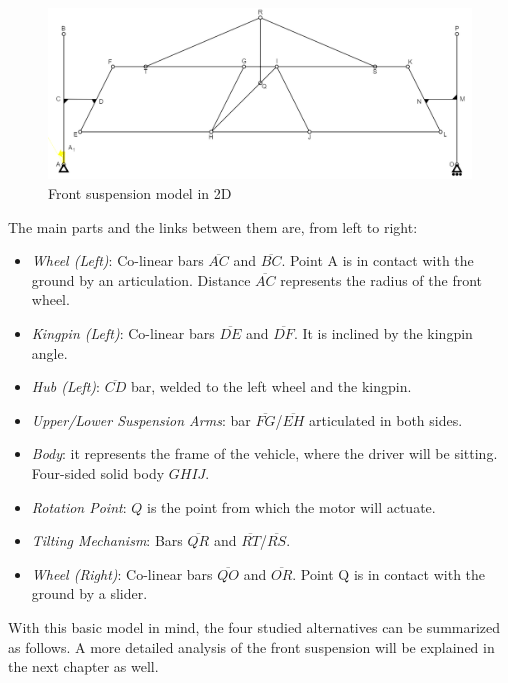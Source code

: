\begin{figure}[h!]
	\includegraphics[width=1.0\linewidth]{figs/04/b}
	\caption{Front suspension model in 2D}
\end{figure}

\newpage
The main parts and the links between them are, from left to right:

\begin{itemize}
\begin{itemize}\itemsep -10pt
	\item \textit{Wheel (Left)}: Co-linear bars $\overline{AC}$ and $\overline{BC}$. Point A is in contact with the ground by an articulation. Distance $\overline{AC}$ represents the radius of the front wheel.
	\item \textit{Kingpin (Left)}: Co-linear bars $\overline{DE}$ and $\overline{DF}$. It is inclined by the kingpin angle. 
	\item \textit{Hub (Left)}: $\overline{CD}$ bar, welded to the left wheel and the kingpin.
	\item \textit{Upper/Lower Suspension Arms}: bar $\overline{FG}$/$\overline{EH}$ articulated in both sides.
	\item \textit{Body}: it represents the frame of the vehicle, where the driver will be sitting. Four-sided solid body $GHIJ$.
	\item \textit{Rotation Point}: $Q$ is the point from which the motor will actuate.
	\item \textit{Tilting Mechanism}: Bars $\overline{QR}$ and $\overline{RT}$/$\overline{RS}$.
	\item \textit{Wheel (Right)}: Co-linear bars $\overline{QO}$ and $\overline{OR}$. Point Q is in contact with the ground by a slider.
\end{itemize}
\end{itemize}

With this basic model in mind, the four studied alternatives can be summarized as follows. A more detailed analysis of the front suspension will be explained in the next chapter as well.

